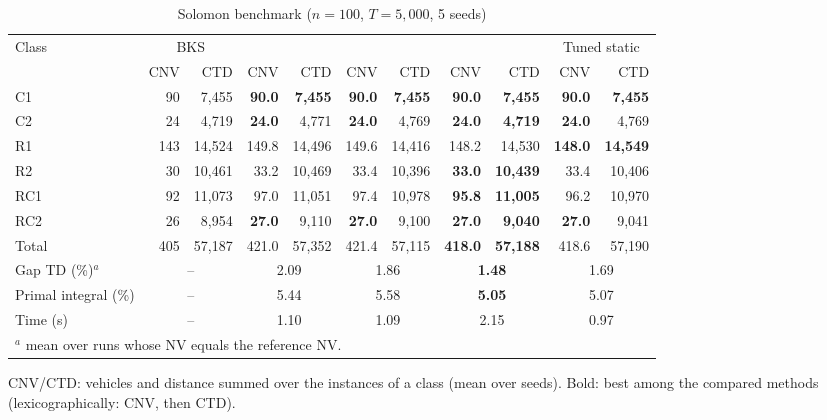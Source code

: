 \begin{table}[t]
\centering
\caption{Solomon benchmark ($n=100$, $T=5{,}000$, 5 seeds)}\label{tab:solomon}
\setlength{\tabcolsep}{3.5pt}
\begin{adjustbox}{max width=\linewidth}
\begin{tabular}{lrrrrrrrrrr}
\toprule
Class & \multicolumn{2}{c}{BKS} & \multicolumn{2}{c}{\Uni{}} & \multicolumn{2}{c}{\Rw{}} & \multicolumn{2}{c}{\sgalns{}} & \multicolumn{2}{c}{Tuned static}\\
\cmidrule(lr){2-3}\cmidrule(lr){4-5}\cmidrule(lr){6-7}\cmidrule(lr){8-9}\cmidrule(lr){10-11}
 & CNV & CTD & CNV & CTD & CNV & CTD & CNV & CTD & CNV & CTD\\ \midrule
C1 & 90 & 7,455 & \textbf{90.0} & \textbf{7,455} & \textbf{90.0} & \textbf{7,455} & \textbf{90.0} & \textbf{7,455} & \textbf{90.0} & \textbf{7,455}\\
C2 & 24 & 4,719 & \textbf{24.0} & 4,771 & \textbf{24.0} & 4,769 & \textbf{24.0} & \textbf{4,719} & \textbf{24.0} & 4,769\\
R1 & 143 & 14,524 & 149.8 & 14,496 & 149.6 & 14,416 & 148.2 & 14,530 & \textbf{148.0} & \textbf{14,549}\\
R2 & 30 & 10,461 & 33.2 & 10,469 & 33.4 & 10,396 & \textbf{33.0} & \textbf{10,439} & 33.4 & 10,406\\
RC1 & 92 & 11,073 & 97.0 & 11,051 & 97.4 & 10,978 & \textbf{95.8} & \textbf{11,005} & 96.2 & 10,970\\
RC2 & 26 & 8,954 & \textbf{27.0} & 9,110 & \textbf{27.0} & 9,100 & \textbf{27.0} & \textbf{9,040} & \textbf{27.0} & 9,041\\
\midrule Total & 405 & 57,187 & 421.0 & 57,352 & 421.4 & 57,115 & \textbf{418.0} & \textbf{57,188} & 418.6 & 57,190\\
\midrule Gap TD (\%)$^{a}$ & \multicolumn{2}{c}{--} & \multicolumn{2}{c}{2.09} & \multicolumn{2}{c}{1.86} & \multicolumn{2}{c}{\textbf{1.48}} & \multicolumn{2}{c}{1.69}\\
Primal integral (\%) & \multicolumn{2}{c}{--} & \multicolumn{2}{c}{5.44} & \multicolumn{2}{c}{5.58} & \multicolumn{2}{c}{\textbf{5.05}} & \multicolumn{2}{c}{5.07}\\
Time (s) & \multicolumn{2}{c}{--} & \multicolumn{2}{c}{1.10} & \multicolumn{2}{c}{1.09} & \multicolumn{2}{c}{2.15} & \multicolumn{2}{c}{0.97}\\
\bottomrule
\multicolumn{11}{l}{\footnotesize $^{a}$ mean over runs whose NV equals the reference NV.}\\
\end{tabular}
\end{adjustbox}
\par\vspace{2pt}\parbox{\linewidth}{\footnotesize CNV/CTD: vehicles and distance summed over the instances of a class (mean over seeds). Bold: best among the compared methods (lexicographically: CNV, then CTD).}
\end{table}

